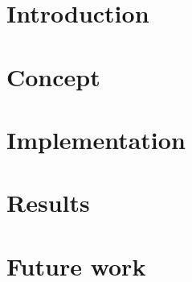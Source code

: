 \documentclass[12pt]{article}
\begin{document}

\tableofcontents
\pagebreak


\pagebreak

\section{Introduction}

\newpage
\section{Concept}

\newpage
\section{Implementation}

\newpage
\section{Results}

\newpage
\section{Future work}

\newpage


\end{document}
